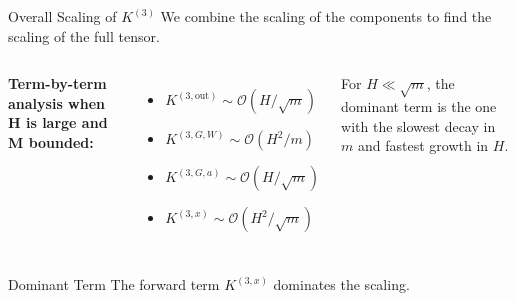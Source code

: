\documentclass{beamer}
\newcommand{\Order}{\mathcal{O}}
\begin{document}
\begin{frame}{Overall Scaling of $K^{(3)}$}
We combine the scaling of the components to find the scaling of the full tensor.

\begin{columns}
\textbf{Term-by-term analysis when H is large and M bounded:}
\begin{itemize}
    \item $K^{(3, \text{out})} \sim \Order(H/\sqrt{m})$
    \item $K^{(3, G, W)} \sim \Order(H^2/m)$
    \item $K^{(3, G, a)} \sim \Order(H/\sqrt{m})$
    \item $K^{(3, x)} \sim \Order(H^2/\sqrt{m})$
\end{itemize}
For $H \ll \sqrt{m}$, the dominant term is the one with the slowest decay in $m$ and fastest growth in $H$.
\end{columns}

\begin{alertblock}{Dominant Term}
The forward term $K^{(3,x)}$ dominates the scaling.
\end{alertblock}

\end{frame}
\end{document}
